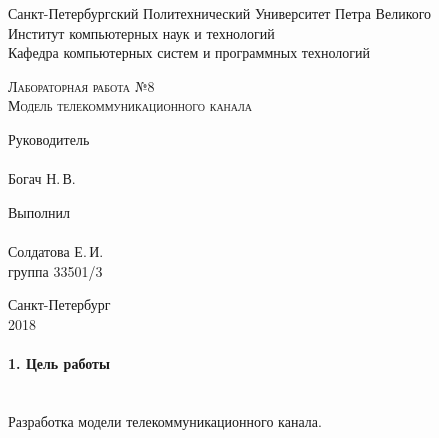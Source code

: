 \documentclass[12pt,a4paper]{report}
\begin{document}
\begin{titlepage}
\newpage
  \begin{center}
     
    Санкт-Петербургский Политехнический Университет Петра Великого \\
    
    Институт компьютерных наук и технологий \\
    
    Кафедра компьютерных систем и программных технологий
    \end{center}
    
    \vspace{15em}
    \begin{center}
    \textsc{Лабораторная работа №8}\\
    \vspace{5mm}
    \textsc{Модель телекоммуникационного канала}
    	
   \end{center}
\vspace{10em}

\newlength{\ML}
\hfill\begin{minipage}{0.45\textwidth}
\vfill
  Руководитель \\
  \\
  \underline{\hspace{\ML}} Богач Н.\,В.\\
 
\end{minipage}%
\bigskip

\hfill\begin{minipage}{0.45\textwidth}
  Выполнил\\
  \\
  \underline{\hspace{\ML}} Солдатова Е.\,И.\\
  группа 33501/3
\end{minipage}%

\vspace{\fill}
\begin{center}
    
  Санкт-Петербург\\
   2018 
\end{center}
\end{titlepage}

\paragraph{1. Цель работы\\\\}
Разработка модели телекоммуникационного канала.
\end{document}

